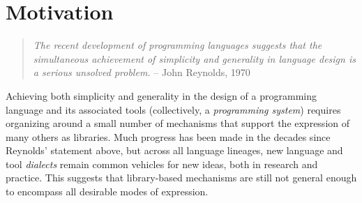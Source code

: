 \vspace{-25pt}
\section{Motivation}\label{motivation}
\begin{quote}\textit{The recent development of programming languages suggests that the simul\-taneous achievement of simplicity 
and generality in language design is a serious unsolved 
problem.} -- John Reynolds, 1970 \cite{Reynolds70}\end{quote}
Achieving both simplicity and generality in the design of a programming language and its associated tools (collectively, a \emph{programming system}) requires organizing around a small number of mechanisms that support the expression of many others   as libraries. %
Much progress has been made in the decades since Reynolds' statement above, but  across all language lineages,  new language and tool \emph{dialects} remain common vehicles for new ideas, both in research and practice. This suggests that library-based mechanisms are still not general enough to encompass all desirable modes of expression. %

